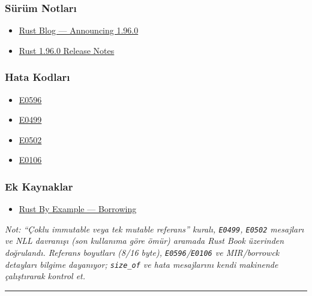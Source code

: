 \documentclass[12pt,a4paper]{article}
\begin{document}
\subsubsection{Sürüm Notları}\label{sürüm-notları-11}

\begin{itemize}
\tightlist
\item
  \href{https://blog.rust-lang.org/2026/05/28/Rust-1.96.0/}{Rust Blog --- Announcing 1.96.0}
\item
  \href{https://doc.rust-lang.org/stable/releases.html\#version-1960-2026-05-28}{Rust 1.96.0 Release Notes}
\end{itemize}

\subsubsection{Hata Kodları}\label{hata-kodları-11}

\begin{itemize}
\tightlist
\item
  \href{https://doc.rust-lang.org/error_codes/E0596.html}{E0596}
\item
  \href{https://doc.rust-lang.org/error_codes/E0499.html}{E0499}
\item
  \href{https://doc.rust-lang.org/error_codes/E0502.html}{E0502}
\item
  \href{https://doc.rust-lang.org/error_codes/E0106.html}{E0106}
\end{itemize}

\subsubsection{Ek Kaynaklar}\label{ek-kaynaklar-11}

\begin{itemize}
\tightlist
\item
  \href{https://doc.rust-lang.org/rust-by-example/scope/borrow.html}{Rust By Example --- Borrowing}
\end{itemize}

\emph{Not: ``Çoklu immutable veya tek mutable referans'' kuralı, \texttt{E0499}, \texttt{E0502} mesajları ve NLL davranışı (son kullanıma göre ömür) aramada Rust Book üzerinden doğrulandı. Referans boyutları (8/16 byte), \texttt{E0596}/\texttt{E0106} ve MIR/borrowck detayları bilgime dayanıyor; \texttt{size\_of} ve hata mesajlarını kendi makinende çalıştırarak kontrol et.}

\begin{center}\rule{0.5\linewidth}{0.5pt}\end{center}
\end{document}
